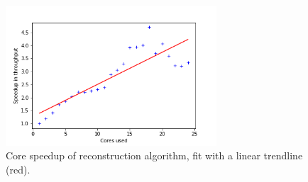 \begin{figure}
    \centering
    \includegraphics[width=0.7\textwidth]{graphs/Cassini_throughput_speedup.png}
    \caption{Core speedup of reconstruction algorithm, fit with a linear trendline (red).}
    \label{fig:through_speedup}
\end{figure}

